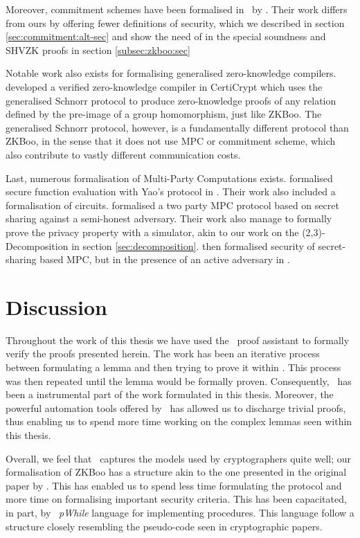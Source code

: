 Moreover, commitment schemes have been formalised in \easycrypt\ by
\cite{DBLP:journals/corr/MetereD17}. Their work differs from ours by offering
fewer definitions of security, which we described in section
\ref{sec:commitment:alt-sec} and show the need of in the special soundness and
SHVZK proofs in section \ref{subsec:zkboo:sec}

Notable work also exists for formalising generalised zero-knowledge compilers.
\cite{zkcrypt} developed a verified zero-knowledge compiler in CertiCrypt
which uses the generalised Schnorr protocol to produce zero-knowledge proofs of
any relation defined by the pre-image of a group homomorphism, just like ZKBoo.
The generalised Schnorr protocol, however, is a fundamentally different protocol
than ZKBoo, in the sense that it does not use MPC or commitment scheme, which
also contribute to vastly different communication costs.

Last, numerous formalisation of Multi-Party Computations exists.
\cite{Yao} formalised secure function evaluation with Yao's protocol in
\easycrypt.
Their work also included a formalisation of circuits.
\cite{DBLP:journals/corr/abs-1805-12482} formalised a two party MPC protocol
based on secret sharing against a semi-honest adversary. Their work also manage
to formally prove the privacy property with a simulator, akin to our work on the
(2,3)-Decomposition in section \ref{sec:decomposition}.
\cite{DBLP:journals/corr/abs-1806-07197} then formalised security of
secret-sharing based MPC, but in the presence of an active adversary in \easycrypt.

\section{Discussion}
\label{sec:discussion}
Throughout the work of this thesis we have used the \easycrypt\ proof assistant
to formally verify the proofs presented herein.
The work has been an iterative process between formulating a lemma and then
trying to prove it within \easycrypt. This process was then repeated until the
lemma would be formally proven. Consequently, \easycrypt\ has been a
instrumental part of the work formulated in this thesis. Moreover, the powerful
automation tools offered by \easycrypt\ has allowed us to discharge trivial
proofs, thus enabling us to spend more time working on the complex lemmas seen
within this thesis.

Overall, we feel that \easycrypt\ captures the models used by cryptographers
quite well; our formalisation of ZKBoo has a structure akin to the one presented
in the original paper by \cite{zkboo}. This has enabled us to spend less time
formulating the protocol and more time on formalising important security criteria.
This has been capacitated, in part, by \easycrypt\ \textit{pWhile} language for
implementing procedures. This language follow a structure closely resembling the
pseudo-code seen in cryptographic papers.

